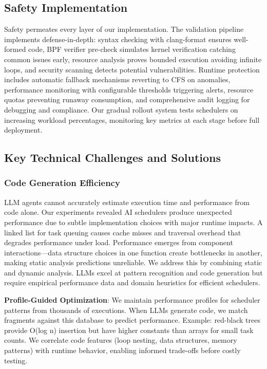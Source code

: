 \subsection{Safety Implementation}

Safety permeates every layer of our implementation. The validation pipeline implements defense-in-depth: syntax checking with clang-format ensures well-formed code, BPF verifier pre-check simulates kernel verification catching common issues early, resource analysis proves bounded execution avoiding infinite loops, and security scanning detects potential vulnerabilities. Runtime protection includes automatic fallback mechanisms reverting to CFS on anomalies, performance monitoring with configurable thresholds triggering alerts, resource quotas preventing runaway consumption, and comprehensive audit logging for debugging and compliance. Our gradual rollout system tests schedulers on increasing workload percentages, monitoring key metrics at each stage before full deployment.

\subsection{Key Technical Challenges and Solutions}

\subsubsection{Code Generation Efficiency}

LLM agents cannot accurately estimate execution time and performance from code alone. Our experiments revealed AI schedulers produce unexpected performance due to subtle implementation choices with major runtime impacts. A linked list for task queuing causes cache misses and traversal overhead that degrades performance under load. Performance emerges from component interactions—data structure choices in one function create bottlenecks in another, making static analysis predictions unreliable. We address this by combining static and dynamic analysis. LLMs excel at pattern recognition and code generation but require empirical performance data and domain heuristics for efficient schedulers.

\textbf{Profile-Guided Optimization}: We maintain performance profiles for scheduler patterns from thousands of executions. When LLMs generate code, we match fragments against this database to predict performance. Example: red-black trees provide O(log n) insertion but have higher constants than arrays for small task counts. We correlate code features (loop nesting, data structures, memory patterns) with runtime behavior, enabling informed trade-offs before costly testing.

